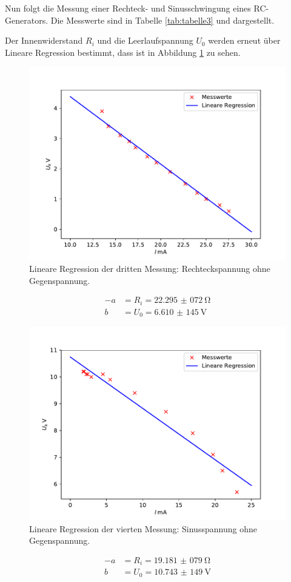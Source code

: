 \noindent Nun folgt die Messung einer Rechteck- und Sinusschwingung eines RC-Generators.
Die Messwerte sind in Tabelle \ref{tab:tabelle3} und dargestellt.

\noindent Der Innenwiderstand $R_{i}$ und die Leerlaufspannung $U_{0}$ werden erneut über Lineare Regression
bestimmt, dass ist in Abbildung \ref{fig:plot3} zu sehen.
\begin{figure}[H]
  \centering
  \includegraphics{plot3.pdf}
  \caption{Lineare Regression der dritten Messung: Rechteckspannung ohne Gegenspannung.}
  \label{fig:plot3}
\end{figure}
\begin{align*}
  -a &= R_{i} = \SI{22,295(072)}{\ohm} \\
  b &= U_{0} = \SI{6,610(145)}{\volt}
\end{align*}

\begin{figure}[H]
  \centering
  \includegraphics{plot4.pdf}
  \caption{Lineare Regression der vierten Messung: Sinusspannung ohne Gegenspannung.}
  \label{fig:plot4}
\end{figure}
\begin{align*}
  -a &= R_{i} = \SI{19,181(079)}{\ohm} \\
  b &= U_{0} = \SI{10,743(149)}{\volt}
\end{align*}

